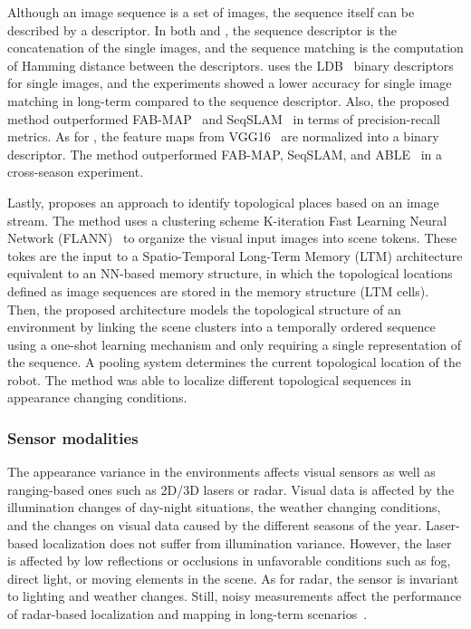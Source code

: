 Although an image sequence is a set of images, the sequence itself can be described by a descriptor. In both \cite{arroyo-et-al:2018:7} and \cite{zhu-et-al:2018:8500686}, the sequence descriptor is the concatenation of the single images, and the sequence matching is the computation of Hamming distance between the descriptors. \cite{arroyo-et-al:2018:7} uses the LDB~\parencite{original:ldb} binary descriptors for single images, and the experiments showed a lower accuracy for single image matching in long-term compared to the sequence descriptor. Also, the proposed method outperformed FAB-MAP~\parencite{discussion:fab-map} and SeqSLAM~\parencite{discussion:seqslam} in terms of precision-recall metrics.
As for \cite{zhu-et-al:2018:8500686}, the feature maps from VGG16~\parencite{original:vgg} are normalized into a binary descriptor. The method outperformed FAB-MAP, SeqSLAM, and ABLE~\parencite{arroyo-et-al:2018:7} in a cross-season experiment.

Lastly, \cite{nguyen-et-al:2013:004} proposes an approach to identify topological places based on an image stream. 
The method uses a clustering scheme K-iteration Fast Learning Neural Network (FLANN)~\parencite{original:kflann} to organize the visual input images into scene tokens. These tokes are the input to a Spatio-Temporal Long-Term Memory (LTM) architecture equivalent to an NN-based memory structure, in which the topological locations defined as image sequences are stored in the memory structure (LTM cells). Then, the proposed architecture models the topological structure of an environment by linking the scene clusters into a temporally ordered sequence using a one-shot learning mechanism and only requiring a single representation of the sequence.
A pooling system determines the current topological location of the robot.
The method was able to localize different topological sequences in appearance changing conditions.



\subsubsection{Sensor modalities}

The appearance variance in the environments affects visual sensors as well as ranging-based ones such as 2D/3D lasers or radar. Visual data is affected by the illumination changes of day-night situations, the weather changing conditions, and the changes on visual data caused by the different seasons of the year. Laser-based localization does not suffer from illumination variance. However, the laser is affected by low reflections or occlusions  in unfavorable conditions such as fog, direct light, or moving elements in the scene. As for radar, the sensor is invariant to lighting and weather changes. Still, noisy measurements affect the performance of radar-based localization and mapping in long-term scenarios~\parencite{yin-et-al:2021:661199}.

